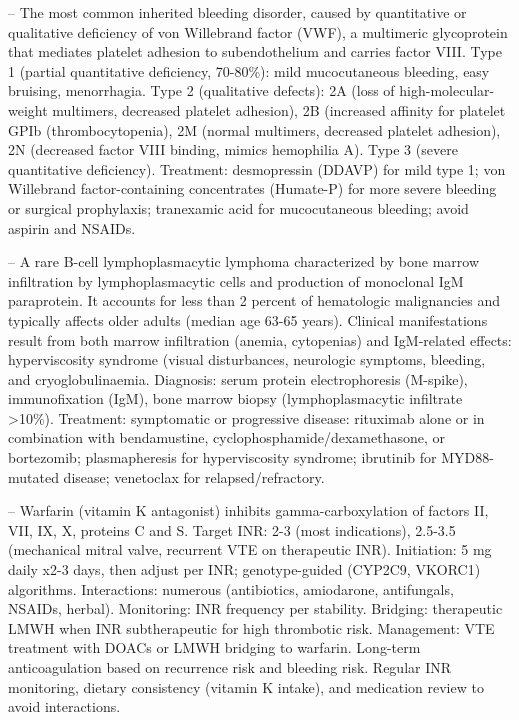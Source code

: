-- The most common inherited bleeding disorder, caused by quantitative or qualitative deficiency of von Willebrand factor (VWF), a multimeric glycoprotein that mediates platelet adhesion to subendothelium and carries factor VIII. Type 1 (partial quantitative deficiency, 70-80\%): mild mucocutaneous bleeding, easy bruising, menorrhagia. Type 2 (qualitative defects): 2A (loss of high-molecular-weight multimers, decreased platelet adhesion), 2B (increased affinity for platelet GPIb (thrombocytopenia), 2M (normal multimers, decreased platelet adhesion), 2N (decreased factor VIII binding, mimics hemophilia A). Type 3 (severe quantitative deficiency). Treatment: desmopressin (DDAVP) for mild type 1; von Willebrand factor-containing concentrates (Humate-P) for more severe bleeding or surgical prophylaxis; tranexamic acid for mucocutaneous bleeding; avoid aspirin and NSAIDs.

-- A rare B-cell lymphoplasmacytic lymphoma characterized by bone marrow infiltration by lymphoplasmacytic cells and production of monoclonal IgM paraprotein. It accounts for less than 2 percent of hematologic malignancies and typically affects older adults (median age 63-65 years). Clinical manifestations result from both marrow infiltration (anemia, cytopenias) and IgM-related effects: hyperviscosity syndrome (visual disturbances, neurologic symptoms, bleeding, and cryoglobulinaemia. Diagnosis: serum protein electrophoresis (M-spike), immunofixation (IgM), bone marrow biopsy (lymphoplasmacytic infiltrate >10\%). Treatment: symptomatic or progressive disease: rituximab alone or in combination with bendamustine, cyclophosphamide/dexamethasone, or bortezomib; plasmapheresis for hyperviscosity syndrome; ibrutinib for MYD88-mutated disease; venetoclax for relapsed/refractory.

-- Warfarin (vitamin K antagonist) inhibits gamma-carboxylation of factors II, VII, IX, X, proteins C and S. Target INR: 2-3 (most indications), 2.5-3.5 (mechanical mitral valve, recurrent VTE on therapeutic INR). Initiation: 5 mg daily x2-3 days, then adjust per INR; genotype-guided (CYP2C9, VKORC1) algorithms. Interactions: numerous (antibiotics, amiodarone, antifungals, NSAIDs, herbal). Monitoring: INR frequency per stability. Bridging: therapeutic LMWH when INR subtherapeutic for high thrombotic risk. Management: VTE treatment with DOACs or LMWH bridging to warfarin. Long-term anticoagulation based on recurrence risk and bleeding risk. Regular INR monitoring, dietary consistency (vitamin K intake), and medication review to avoid interactions.

